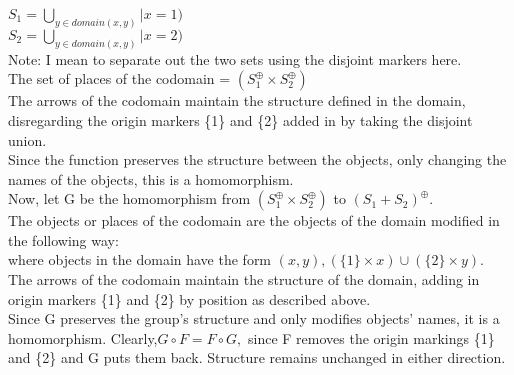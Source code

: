   $S_1 =  \bigcup_{ y \in domain (x, y)} | x=1)$\\
  $S_2 =  \bigcup_{y \in domain (x, y)} | x=2)$\\
Note: I mean to separate out the two sets using the disjoint markers here.\\
The set of places of the codomain = $(S_1 ^\oplus \times S_2 ^\oplus)$\\
The arrows of the codomain maintain the structure defined in the domain, disregarding the origin markers \{1\} and \{2\} added in by taking the disjoint union.\\
Since the function preserves the structure between the objects, only changing the names of the objects, this is a homomorphism.\\
Now, let G be the homomorphism from $(S_1 ^\oplus \times S_2 ^\oplus)$ to $(S_1 + S_2)^\oplus$. \\
The objects or places of the codomain are the objects of the domain modified in the following way:\\
where objects in the domain have the form $(x, y), (\{1\} \times x) \cup (\{2\} \times y).$\\
The arrows of the codomain maintain the structure of the domain, adding in origin markers \{1\} and \{2\} by position as described above.\\
Since G preserves the group's structure and only modifies objects' names, it is a homomorphism. 
Clearly,$ G \circ F = F \circ G,$ since F removes the origin markings  \{1\} and \{2\} and G puts them back. Structure remains unchanged in either direction.\\
\newpage

